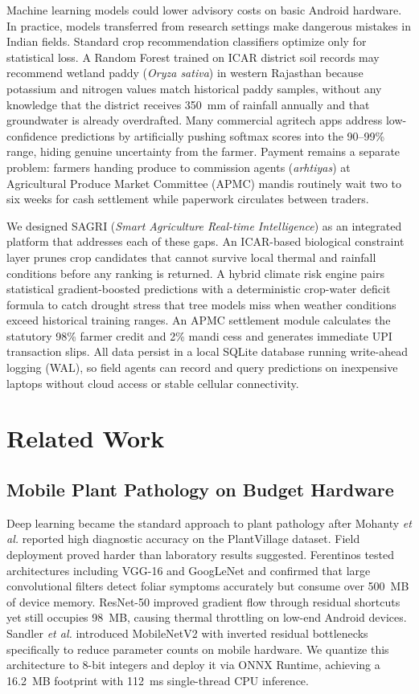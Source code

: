 \documentclass[conference]{IEEEtran}
\begin{document}
Machine learning models could lower advisory costs on basic Android hardware. In practice, models transferred from research settings make dangerous mistakes in Indian fields. Standard crop recommendation classifiers optimize only for statistical loss. A Random Forest trained on ICAR district soil records may recommend wetland paddy (\textit{Oryza sativa}) in western Rajasthan because potassium and nitrogen values match historical paddy samples, without any knowledge that the district receives 350~mm of rainfall annually and that groundwater is already overdrafted. Many commercial agritech apps address low-confidence predictions by artificially pushing softmax scores into the 90--99\% range, hiding genuine uncertainty from the farmer. Payment remains a separate problem: farmers handing produce to commission agents (\textit{arhtiyas}) at Agricultural Produce Market Committee (APMC) mandis routinely wait two to six weeks for cash settlement while paperwork circulates between traders.

We designed SAGRI (\textit{Smart Agriculture Real-time Intelligence}) as an integrated platform that addresses each of these gaps. An ICAR-based biological constraint layer prunes crop candidates that cannot survive local thermal and rainfall conditions before any ranking is returned. A hybrid climate risk engine pairs statistical gradient-boosted predictions with a deterministic crop-water deficit formula to catch drought stress that tree models miss when weather conditions exceed historical training ranges. An APMC settlement module calculates the statutory 98\% farmer credit and 2\% mandi cess and generates immediate UPI transaction slips. All data persist in a local SQLite database running write-ahead logging (WAL), so field agents can record and query predictions on inexpensive laptops without cloud access or stable cellular connectivity.

\section{Related Work}

\subsection{Mobile Plant Pathology on Budget Hardware}
Deep learning became the standard approach to plant pathology after Mohanty \textit{et al.} \cite{ref_mohanty} reported high diagnostic accuracy on the PlantVillage dataset. Field deployment proved harder than laboratory results suggested. Ferentinos \cite{ref_ferentinos} tested architectures including VGG-16 \cite{ref_vgg} and GoogLeNet and confirmed that large convolutional filters detect foliar symptoms accurately but consume over 500~MB of device memory. ResNet-50 \cite{ref_resnet} improved gradient flow through residual shortcuts yet still occupies 98~MB, causing thermal throttling on low-end Android devices. Sandler \textit{et al.} introduced MobileNetV2 \cite{ref_mobilenet} with inverted residual bottlenecks specifically to reduce parameter counts on mobile hardware. We quantize this architecture to 8-bit integers and deploy it via ONNX Runtime, achieving a 16.2~MB footprint with 112~ms single-thread CPU inference.
\end{document}
